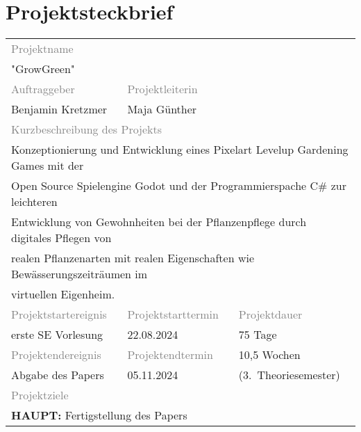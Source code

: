 \chapter{Projektsteckbrief}\label{ch:steckbrief}
\vspace{2cm}
\begin{table}[H]\label{tab:psPeople}
    \begin{tabular}{|l|l|l|}
        \hline
        \multicolumn{3}{|l|}{\footnotesize{\textcolor{gray}{Projektname}}}\\
        \multicolumn{3}{|l|}{"GrowGreen"}\\
        \hline
        \footnotesize{\textcolor{gray}{Auftraggeber}} & \multicolumn{2}{|l|}{\footnotesize{\textcolor{gray}{Projektleiterin}}}\\
        Benjamin Kretzmer & \multicolumn{2}{|l|}{Maja Günther}\\
        \hline
        \multicolumn{3}{|l|}{\footnotesize{\textcolor{gray}{Kurzbeschreibung des Projekts}}}\\
        \multicolumn{3}{|l|}{Konzeptionierung und Entwicklung eines Pixelart Levelup Gardening Games mit der}\\
        \multicolumn{3}{|l|}{Open Source Spielengine Godot und der Programmierspache C\# zur leichteren }\\
        \multicolumn{3}{|l|}{Entwicklung von Gewohnheiten bei der Pflanzenpflege durch digitales Pflegen von}\\
        \multicolumn{3}{|l|}{realen Pflanzenarten mit realen Eigenschaften wie Bewässerungszeiträumen im }\\
        \multicolumn{3}{|l|}{virtuellen Eigenheim.}\\
        \hline
        \footnotesize{\textcolor{gray}{Projektstartereignis}} & \footnotesize{\textcolor{gray}{Projektstarttermin}} & \footnotesize{\textcolor{gray}{Projektdauer}}\\
        erste SE Vorlesung & 22.08.2024 & 75 Tage\\
        \hline
        \footnotesize{\textcolor{gray}{Projektendereignis}} & \footnotesize{\textcolor{gray}{Projektendtermin}} & 10,5 Wochen\\
        Abgabe des Papers & 05.11.2024 & (3.\ Theoriesemester)\\
        \hline
        \multicolumn{3}{|l|}{\footnotesize{\textcolor{gray}{Projektziele}}}\\
        \multicolumn{3}{|l|}{\textbf{HAUPT:} Fertigstellung des Papers}\\

\end{tabular}
\end{table}
